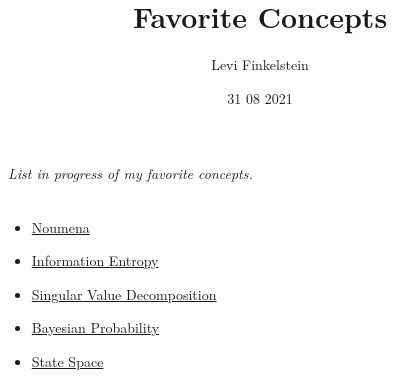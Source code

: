 \title{Favorite Concepts}
\author{Levi Finkelstein}
\date{31 08 2021}

\maketitle

\textit{List in progress of my favorite concepts.}
\\\\
\begin{itemize}
    \item \href{https://en.wikipedia.org/wiki/Noumenon}{Noumena}
    \item \href{https://en.wikipedia.org/wiki/Entropy_(information_theory)}{Information Entropy}
    \item \href{https://en.wikipedia.org/wiki/Singular_value_decomposition}{Singular Value Decomposition}
    \item \href{https://en.wikipedia.org/wiki/Bayesian_probability}{Bayesian Probability}
    \item \href{https://en.wikipedia.org/wiki/State_space}{State Space}

\end{itemize}

 

